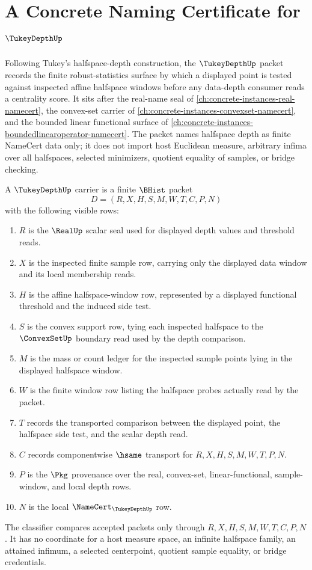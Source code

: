 \chapter{A Concrete Naming Certificate for $\TukeyDepthUp$}
\label{ch:concrete-instances-tukey-depth-namecert}

Following Tukey's halfspace-depth construction, the $\TukeyDepthUp$ packet records the finite robust-statistics surface by which a displayed point is tested against inspected affine halfspace windows before any data-depth consumer reads a centrality score. It sits after the real-name seal of \autoref{ch:concrete-instances-real-namecert}, the convex-set carrier of \autoref{ch:concrete-instances-convexset-namecert}, and the bounded linear functional surface of \autoref{ch:concrete-instances-boundedlinearoperator-namecert}. The packet names halfspace depth as finite NameCert data only; it does not import host Euclidean measure, arbitrary infima over all halfspaces, selected minimizers, quotient equality of samples, or bridge checking.

\begin{definition}
\label{def:tukey-depth-carrier}
A $\TukeyDepthUp$ carrier is a finite $\BHist$ packet
$$
D=(R,X,H,S,M,W,T,C,P,N)
$$
with the following visible rows:
\begin{enumerate}
\item $R$ is the $\RealUp$ scalar seal used for displayed depth values and threshold reads.
\item $X$ is the inspected finite sample row, carrying only the displayed data window and its local membership reads.
\item $H$ is the affine halfspace-window row, represented by a displayed functional threshold and the induced side test.
\item $S$ is the convex support row, tying each inspected halfspace to the $\ConvexSetUp$ boundary read used by the depth comparison.
\item $M$ is the mass or count ledger for the inspected sample points lying in the displayed halfspace window.
\item $W$ is the finite window row listing the halfspace probes actually read by the packet.
\item $T$ records the transported comparison between the displayed point, the halfspace side test, and the scalar depth read.
\item $C$ records componentwise $\hsame$ transport for $R,X,H,S,M,W,T,P,N$.
\item $P$ is the $\Pkg$ provenance over the real, convex-set, linear-functional, sample-window, and local depth rows.
\item $N$ is the local $\NameCert_{\TukeyDepthUp}$ row.
\end{enumerate}
The classifier compares accepted packets only through $R,X,H,S,M,W,T,C,P,N$. It has no coordinate for a host measure space, an infinite halfspace family, an attained infimum, a selected centerpoint, quotient sample equality, or bridge credentials.
\end{definition}


